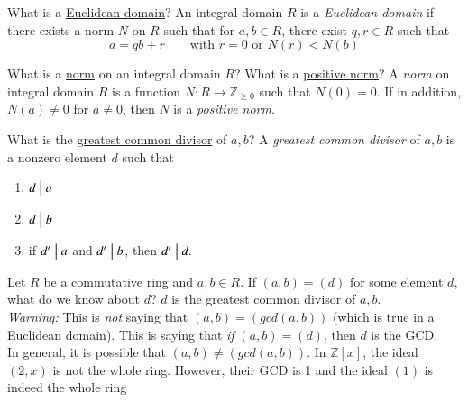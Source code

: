 \documentclass[avery5371,grid]{flashcards}
\newcommand{\Z}{\mathbb{Z}}
\newcommand{\divides}{\bigm|}
\begin{document}
\begin{flashcard}[Rings]{What is a \underline{Euclidean domain}?}
 An integral domain $R$ is a \emph{Euclidean domain} if there exists a norm $N$ on $R$ such that for $a,b \in R$, there exist $q,r \in R$ such that
  $$
 a = qb + r \qquad \text{with }r=0 \text{ or }N(r) < N(b)
 $$
\end{flashcard}

\begin{flashcard}[Rings]{What is a \underline{norm} on an integral domain $R$? What is a \underline{positive norm}?}
 A \emph{norm} on integral domain $R$ is a function $N: R \to \Z_{\geq 0}$ such that $N(0) = 0$. If in addition, $N(a) \neq 0$ for $a \neq 0$, then $N$ is a \emph{positive norm}.
\end{flashcard}


\begin{flashcard}[Rings]{What is the \underline{greatest common divisor} of $a,b$?}
 A \emph{greatest common divisor} of $a,b$ is a nonzero element $d$ such that
 \begin{enumerate}
      \item $d \divides a$
      \item $d \divides b$
      \item if $d' \divides a$ and $d' \divides b$, then $d' \divides d.$
 \end{enumerate}
\end{flashcard}

\begin{flashcard}[Rings]{Let $R$ be a commutative ring and $a,b \in R$. If $(a,b) = (d)$ for some element $d$, what do we know about $d$?}
 $d$ is the greatest common divisor of $a,b$.\\
 
 \emph{Warning: }This is \emph{not} saying that $(a,b) = (gcd(a,b))$ (which is true in a Euclidean domain). This is saying that \emph{if} $(a,b) = (d)$, then $d$ is the GCD. \\
 
 In general, it is possible that $(a,b) \neq (gcd(a,b))$. In $\Z[x]$, the ideal $(2,x)$ is not the whole ring. However, their GCD is 1 and the ideal $(1)$ is indeed the whole ring
\end{flashcard}
\end{document}
